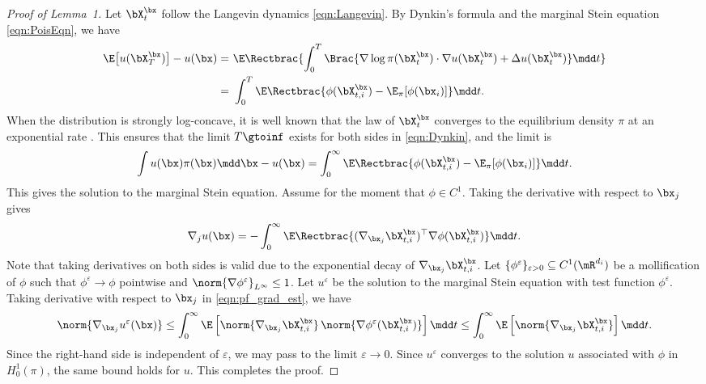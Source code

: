 \documentclass[11pt]{article}
\begin{document}
\begin{proof}[Proof of Lemma~1]
Let $\bX_t^\bx$ follow the Langevin dynamics \eqref{eqn:Langevin}. By Dynkin's formula \cite{MR2001996} and the marginal Stein equation \eqref{eqn:PoisEqn}, we have
\begin{equation}
\label{eqn:Dynkin}
\begin{split}
    \E \big[ u(\bX_T^\bx) \big] - u(\bx) =~& \E \Rectbrac{ \int_0^T \Brac{ \nabla \log \pi (\bX_t^\bx) \cdot \nabla u(\bX_t^\bx) + \Delta u(\bX_t^\bx) } \mdd t } \\
    =~& \int_0^T \E \Rectbrac{ \phi(\bX_{t,i}^\bx) - \E_\pi[\phi(\bx_i)] } \mdd t.
\end{split}
\end{equation}
When the distribution is strongly log-concave, it is well known that the law of $\bX_t^\bx$ converges to the equilibrium density $\pi$ at an exponential rate \cite{chewi2023logconcave}.
This ensures that the limit $T\gtoinf$ exists for both sides in \eqref{eqn:Dynkin}, and the limit is 
\begin{equation}
    \int u(\bx) \pi(\bx) \mdd \bx - u(\bx) = \int_0^\infty \E \Rectbrac{ \phi(\bX_{t,i}^\bx) - \E_\pi[\phi(\bx_i)] } \mdd t.
\end{equation}
This gives the solution to the marginal Stein equation.
%
Assume for the moment that $\phi \in C^1$.
Taking the derivative with respect to $\bx_j$ gives
\begin{equation}
\label{eqn:pf_grad_est}
    \nabla_j u(\bx) = - \int_0^\infty \E \Rectbrac{ (\nabla_{\bx_j} \bX_{t,i}^\bx)^\top \nabla \phi (\bX_{t,i}^\bx) } \mdd t. 
\end{equation}
Note that taking derivatives on both sides is valid due to the exponential decay of $\nabla_{\bx_j} \bX_{t,i}^\bx$.
Let \(\{\phi^\varepsilon\}_{\varepsilon>0}\subseteq C^1(\mR^{d_i})\) be a mollification of \(\phi\) such that $\phi^\varepsilon \to \phi$ pointwise and $\norm{\nabla \phi^\varepsilon}_{L^\infty} \le 1$.
%
Let \(u^\varepsilon\) be the solution to the marginal Stein equation with test function \(\phi^\varepsilon\).
Taking derivative with respect to \(\bx_j\) in \eqref{eqn:pf_grad_est}, we have
\begin{equation}
\label{eqn:mollified_grad_bound}
    \norm{\nabla_{\bx_j} u^\varepsilon(\bx)}
    \le
    \int_0^\infty
    \E\left[
        \norm{\nabla_{\bx_j} \bX_{t,i}^{\bx}}\,
        \norm{\nabla \phi^\varepsilon(\bX_{t,i}^{\bx})}
    \right]
    \mdd t
    \le
    \int_0^\infty
    \E\left[
        \norm{\nabla_{\bx_j} \bX_{t,i}^{\bx}}
    \right]
    \mdd t .
\end{equation}
Since the right-hand side is independent of \(\varepsilon\), we may pass to the limit \(\varepsilon\to0\).
Since \(u^\varepsilon\) converges to the solution \(u\) associated with \(\phi\) in $H_0^1(\pi)$, the same bound holds for \(u\). This completes the proof.
\end{proof}
\end{document}
